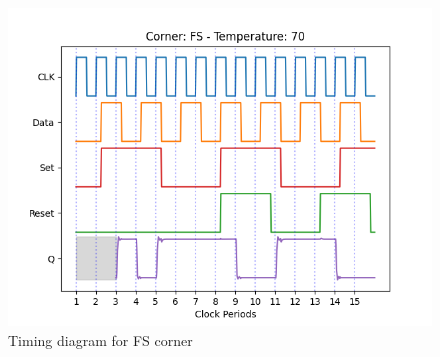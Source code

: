 \begin{figure}[H]
    \centering
    \begin{minipage}{0.5\textwidth}
        \centering
        \includegraphics[width=\textwidth]{Figures/Aimspice_Plots/FS_70.png}
        \caption{Timing diagram for FS corner}
        \label{figFS70}
    \end{minipage}%
\end{figure}

